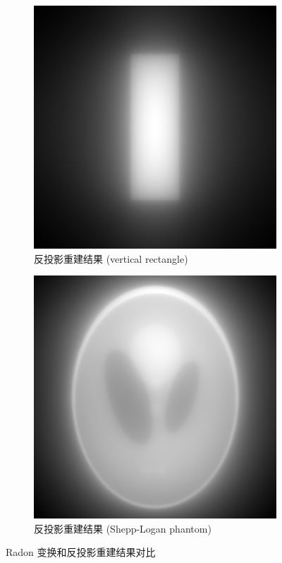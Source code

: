 \documentclass{article}
\begin{document}
\begin{figure}[H]
    \begin{subfigure}{0.45\textwidth}
        \includegraphics[width=\textwidth]{../result_1_2/vertical_rectangle_2.png}
        \caption{反投影重建结果 (vertical rectangle)}
    \end{subfigure}
    \hfill
    \begin{subfigure}{0.45\textwidth}
        \includegraphics[width=\textwidth]{../result_1_2/shepp-logan_phantom_2.png}
        \caption{反投影重建结果 (Shepp-Logan phantom)}
    \end{subfigure}
    \caption{Radon 变换和反投影重建结果对比}
\end{figure}
\end{document}
